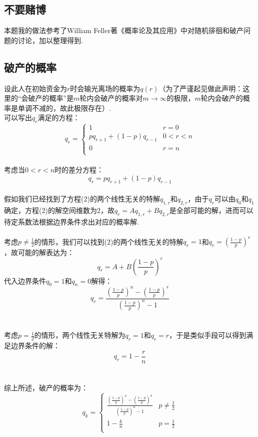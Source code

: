 \documentclass{article}
\begin{document}
\begin{CJK}{UTF8}{gbsn}
\section{不要赌博}
本题我的做法参考了William Feller著《概率论及其应用》中对随机徘徊和破产问题的讨论，加以整理得到.
\subsection{破产的概率}
设此人在初始资金为$r$时会输光离场的概率为$q(r)$（为了严谨起见做此声明：这里的“会破产的概率”是$m$轮内会破产的概率对$m\to \infty$的极限，$m$轮内会破产的概率是单调不减的，故此极限存在）.
\\可以写出$q_{r}$满足的方程：
\\
\begin{equation}
    q_{r}=\left\{
    \begin{array}{cl}
    1  &  r=0\\
    pq_{r+1}+(1-p)q_{r-1} & 0<r<n\\
    0  &  r=n\\
    \end{array}\right.
    \end{equation}
\\考虑当$0<r<n$时的差分方程：\\
\begin{equation}
    q_{r}=pq_{r+1}+(1-p)q_{r-1}
\end{equation}
\\假如我们已经找到了方程(2)的两个线性无关的特解$q_{1,r}$和$q_{2,r}$，由于$q_{r}$可以由$q_{0}$和$q_{1}$确定，方程(2)的解空间维数为2，故$q_{r}=Aq_{1,r}+Bq_{2,r}$是全部可能的解，进而可以待定系数法根据边界条件求出对应的概率解.
\\\\考虑$p\neq \frac{1}{2}$的情形，我们可以找到(2)的两个线性无关的特解$q_{r}=1$和$q_{r}=(\frac{1-p}{p})^{r}$，故可能的解表达为：
$$ q_{r}=A+B(\frac{1-p}{p})^{r} $$
代入边界条件$q_{0}=1$和$q_{n}=0$解得：
$$ q_{r}=\frac{(\frac{1-p}{p})^{n}-(\frac{1-p}{p})^r}{(\frac{1-p}{p})^{n}-1} $$
\\\\考虑$p=\frac{1}{2}$的情形，两个线性无关特解为$q_{r}=1$和$q_{r}=r$，于是类似手段可以得到满足边界条件的解：
$$ q_{r}=1-\frac{r}{n} $$
\\\\综上所述，破产的概率为：
\\
\begin{equation}
    q_{k}=\left\{
    \begin{array}{cl}
        \frac{(\frac{1-p}{p})^{n}-(\frac{1-p}{p})^k}{(\frac{1-p}{p})^{n}-1} & p\neq \frac{1}{2} \\
        1-\frac{k}{n} & p=\frac{1}{2}\\
    \end{array}\right.
\end{equation}

\end{CJK}
\end{document}
